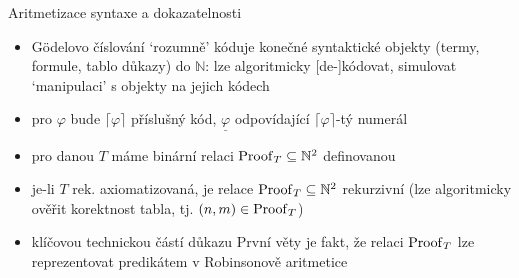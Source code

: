 \documentclass{beamer}
\begin{document}
\begin{frame}{Aritmetizace syntaxe a dokazatelnosti}
    
    \begin{itemize}
        \item \alert{Gödelovo číslování} `rozumně' kóduje konečné syntaktické objekty (termy, formule, tablo důkazy) do $\mathbb N$: lze algoritmicky [de-]kódovat, simulovat `manipulaci' s objekty na jejich kódech
        \item pro $\varphi$ bude \alert{$\lceil\varphi\rceil$} příslušný kód, \alert{$\underline{\varphi}$} odpovídající $\lceil\varphi\rceil$-tý numerál
        \item pro danou $T$ máme binární relaci $\operatorname{Proof}_T\subseteq\mathbb N^2$ definovanou
        \hspace{-1cm}
        \item je-li $T$ rek. axiomatizovaná, je relace $\operatorname{Proof}_T\subseteq\mathbb N^2$ \alert{rekurzivní} (lze algoritmicky ověřit korektnost tabla, tj. $(n,m)\in\operatorname{Proof}_T$)
        \item klíčovou technickou částí důkazu První věty je fakt, že relaci $\operatorname{Proof}_T$ lze \alert{reprezentovat} predikátem v Robinsonově aritmetice

    \end{itemize}    

\end{frame}
\end{document}
